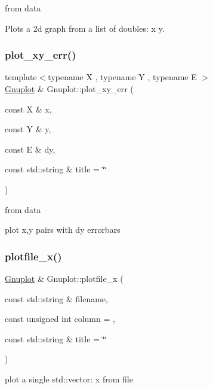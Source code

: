 from data 

Plots a 2d graph from a list of doubles\+: x y. \mbox{\label{classGnuplot_a3c5d382eba33f92b26ba85f201bc7dea}} 
\subsubsection{\texorpdfstring{plot\+\_\+xy\+\_\+err()}{plot\_xy\_err()}}
{\footnotesize\ttfamily template$<$typename X , typename Y , typename E $>$ \\
\hyperlink{classGnuplot}{Gnuplot} \& Gnuplot\+::plot\+\_\+xy\+\_\+err (\begin{DoxyParamCaption}\item[{const X \&}]{x,  }\item[{const Y \&}]{y,  }\item[{const E \&}]{dy,  }\item[{const std\+::string \&}]{title = {\ttfamily \char`\"{}\char`\"{}} }\end{DoxyParamCaption})}



from data 





plot x,y pairs with dy errorbars \mbox{\label{classGnuplot_a4fc34218cdfdd27a65b92eea1f1f9e84}} 
\subsubsection{\texorpdfstring{plotfile\+\_\+x()}{plotfile\_x()}}
{\footnotesize\ttfamily \hyperlink{classGnuplot}{Gnuplot} \& Gnuplot\+::plotfile\+\_\+x (\begin{DoxyParamCaption}\item[{const std\+::string \&}]{filename,  }\item[{const unsigned int}]{column = {},  }\item[{const std\+::string \&}]{title = {\ttfamily \char`\"{}\char`\"{}} }\end{DoxyParamCaption})}

plot a single std\+::vector\+: x from file \mbox{\label{classGnuplot_a10e1fc7344bd726faa2d70cd5ced5e5e}} 
